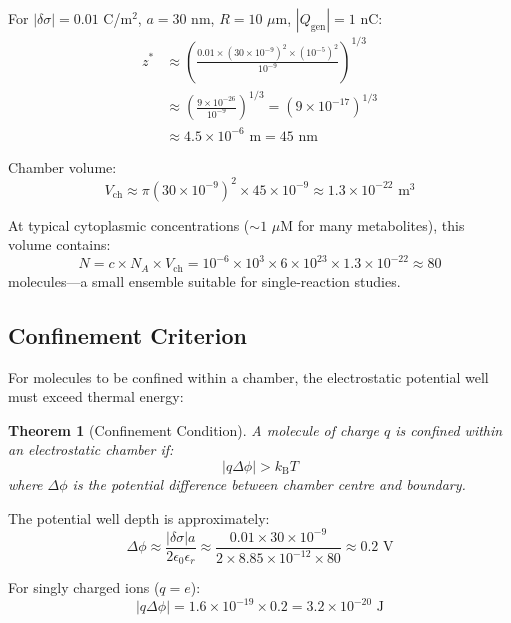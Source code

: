 \documentclass[twocolumn,10pt,aps,prd,superscriptaddress,floatfix,nofootinbib]{revtex4-2}
\newtheorem{theorem}{Theorem}[section]
\theoremstyle{remark}
\newcommand{\kB}{k_{\mathrm{B}}}
\newcommand{\Qgen}{Q_{\mathrm{gen}}}
\begin{document}
For $|\delta\sigma| = 0.01$ C/m$^2$, $a = 30$ nm, $R = 10$ $\mu$m, $|\Qgen| = 1$ nC:
\begin{align}
z^* &\approx \left(\frac{0.01 \times (30 \times 10^{-9})^2 \times (10^{-5})^2}{10^{-9}}\right)^{1/3} \nonumber \\
&\approx \left(\frac{9 \times 10^{-26}}{10^{-9}}\right)^{1/3} = (9 \times 10^{-17})^{1/3} \nonumber \\
&\approx 4.5 \times 10^{-6} \text{ m} = 45 \text{ nm}
\end{align}

Chamber volume:
\begin{equation}
V_{\mathrm{ch}} \approx \pi (30 \times 10^{-9})^2 \times 45 \times 10^{-9} \approx 1.3 \times 10^{-22} \text{ m}^3
\end{equation}

At typical cytoplasmic concentrations ($\sim 1$ $\mu$M for many metabolites), this volume contains:
\begin{equation}
N = c \times N_A \times V_{\mathrm{ch}} = 10^{-6} \times 10^{3} \times 6 \times 10^{23} \times 1.3 \times 10^{-22} \approx 80
\end{equation}
molecules---a small ensemble suitable for single-reaction studies.

\subsection{Confinement Criterion}

For molecules to be confined within a chamber, the electrostatic potential well must exceed thermal energy:

\begin{theorem}[Confinement Condition]
\label{thm:confinement}
A molecule of charge $q$ is confined within an electrostatic chamber if:
\begin{equation}
|q \Delta\phi| > \kB T
\label{eq:confinement}
\end{equation}
where $\Delta\phi$ is the potential difference between chamber centre and boundary.
\end{theorem}

The potential well depth is approximately:
\begin{equation}
\Delta\phi \approx \frac{|\delta\sigma| a}{2\epsilon_0\epsilon_r} \approx \frac{0.01 \times 30 \times 10^{-9}}{2 \times 8.85 \times 10^{-12} \times 80} \approx 0.2 \text{ V}
\end{equation}

For singly charged ions ($q = e$):
\begin{equation}
|q\Delta\phi| = 1.6 \times 10^{-19} \times 0.2 = 3.2 \times 10^{-20} \text{ J}
\end{equation}
\end{document}
